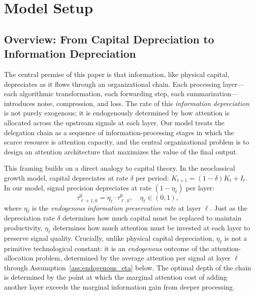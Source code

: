 \section{Model Setup}
\label{sec:model}

\subsection{Overview: From Capital Depreciation to Information Depreciation}
\label{subsec:capital_to_information}

The central premise of this paper is that information, like physical capital, depreciates as it flows through an organizational chain. Each processing layer---each algorithmic transformation, each forwarding step, each summarization---introduces noise, compression, and loss. The rate of this \emph{information depreciation} is not purely exogenous; it is endogenously determined by how attention is allocated across the upstream signals at each layer. Our model treats the delegation chain as a sequence of information-processing stages in which the scarce resource is attention capacity, and the central organizational problem is to design an attention architecture that maximizes the value of the final output.

This framing builds on a direct analogy to capital theory. In the neoclassical growth model, capital depreciates at rate $\delta$ per period: $K_{t+1} = (1-\delta) K_t + I_t$. In our model, signal precision depreciates at rate $(1-\eta_\ell)$ per layer:
\begin{equation}\label{eq:information_depreciation_analogy}
\tau^{0}_{\ell+1,k} = \eta_\ell \cdot \tau^{0}_{\ell,k}, \quad \eta_\ell \in (0,1),
\end{equation}
where $\eta_\ell$ is the \emph{endogenous information preservation rate} at layer $\ell$. Just as the depreciation rate $\delta$ determines how much capital must be replaced to maintain productivity, $\eta_\ell$ determines how much attention must be invested at each layer to preserve signal quality. Crucially, unlike physical capital depreciation, $\eta_\ell$ is not a primitive technological constant: it is an \emph{endogenous} outcome of the attention-allocation problem, determined by the average attention per signal at layer $\ell$ through Assumption~\ref{ass:endogenous_eta} below. The optimal depth of the chain is determined by the point at which the marginal attention cost of adding another layer exceeds the marginal information gain from deeper processing.

